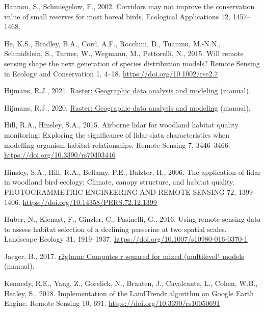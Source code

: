 \documentclass[
  12pt,
]{article}
\newlength{\cslhangindent}
\newlength{\cslentryspacingunit} %
\newenvironment{CSLReferences}[2] %
 {%
  \setlength{\parindent}{0pt}
  \ifodd #1
  \let\oldpar\par
  \def\par{\hangindent=\cslhangindent\oldpar}
  \fi
  \setlength{\parskip}{#2\cslentryspacingunit}
 }%
 {}
\begin{document}
\begin{CSLReferences}{1}{0}
\leavevmode{}%
Hannon, S., Schmiegelow, F., 2002. Corridors may not improve the conservation value of small reserves for most boreal birds. Ecological Applications 12, 1457--1468.

\leavevmode{}%
He, K.S., Bradley, B.A., Cord, A.F., Rocchini, D., Tuanmu, M.-N.N., Schmidtlein, S., Turner, W., Wegmann, M., Pettorelli, N., 2015. Will remote sensing shape the next generation of species distribution models? Remote Sensing in Ecology and Conservation 1, 4--18. \url{https://doi.org/10.1002/rse2.7}

\leavevmode{}%
Hijmans, R.J., 2021. \href{https://CRAN.R-project.org/package=raster}{Raster: {Geographic} data analysis and modeling} (manual).

\leavevmode{}%
Hijmans, R.J., 2020. \href{https://CRAN.R-project.org/package=raster}{Raster: {Geographic} data analysis and modeling} (manual).

\leavevmode{}%
Hill, R.A., Hinsley, S.A., 2015. Airborne lidar for woodland habitat quality monitoring: {Exploring} the significance of lidar data characteristics when modelling organism-habitat relationships. Remote Sensing 7, 3446--3466. \url{https://doi.org/10.3390/rs70403446}

\leavevmode{}%
Hinsley, S.A., Hill, R.A., Bellamy, P.E., Balzter, H., 2006. The application of lidar in woodland bird ecology: {Climate}, canopy structure, and habitat quality. PHOTOGRAMMETRIC ENGINEERING AND REMOTE SENSING 72, 1399--1406. \url{https://doi.org/10.14358/PERS.72.12.1399}

\leavevmode{}%
Huber, N., Kienast, F., Ginzler, C., Pasinelli, G., 2016. Using remote-sensing data to assess habitat selection of a declining passerine at two spatial scales. Landscape Ecology 31, 1919--1937. \url{https://doi.org/10.1007/s10980-016-0370-1}

\leavevmode{}%
Jaeger, B., 2017. \href{https://CRAN.R-project.org/package=r2glmm}{r2glmm: {Computes} r squared for mixed (multilevel) models} (manual).

\leavevmode{}%
Kennedy, R.E., Yang, Z., Gorelick, N., Braaten, J., Cavalcante, L., Cohen, W.B., Healey, S., 2018. Implementation of the {LandTrendr} algorithm on {Google} {Earth} {Engine}. Remote Sensing 10, 691. \url{https://doi.org/10.3390/rs10050691}


\end{CSLReferences}
\end{document}
